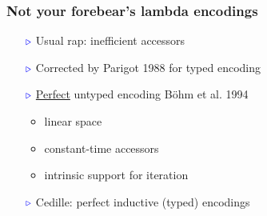 \documentclass[11pt]{beamer}
\newcommand{\myb}[0]{\ensuremath{\textcolor{blue}{\triangleright}}}
\begin{document}
\begin{frame}
  \frametitle{Not your forebear's lambda encodings}

  \begin{itemize}
  \item[$\myb$] Usual rap: inefficient accessors
  \item[$\myb$] Corrected by Parigot 1988 for typed encoding
  \item[$\myb$] \underline{Perfect} untyped encoding B\"ohm et al. 1994
    \begin{itemize}
    \item linear space
    \item constant-time accessors
    \item intrinsic support for iteration
    \end{itemize}
  \item[$\myb$] Cedille: perfect inductive (typed) encodings
  \end{itemize}

  \end{frame}
\end{document}
